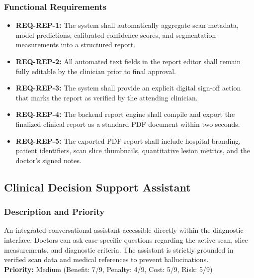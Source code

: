 \documentclass[12pt,a4paper]{report}
\begin{document}
\subsubsection{Functional Requirements}
\begin{itemize}
    \item \textbf{REQ-REP-1:} The system shall automatically aggregate scan metadata, model predictions, calibrated confidence scores, and segmentation measurements into a structured report.
    \item \textbf{REQ-REP-2:} All automated text fields in the report editor shall remain fully editable by the clinician prior to final approval.
    \item \textbf{REQ-REP-3:} The system shall provide an explicit digital sign-off action that marks the report as verified by the attending clinician.
    \item \textbf{REQ-REP-4:} The backend report engine shall compile and export the finalized clinical report as a standard PDF document within two seconds.
    \item \textbf{REQ-REP-5:} The exported PDF report shall include hospital branding, patient identifiers, scan slice thumbnails, quantitative lesion metrics, and the doctor's signed notes.
\end{itemize}

\subsection{Clinical Decision Support Assistant}
\subsubsection{Description and Priority}
An integrated conversational assistant accessible directly within the diagnostic interface. Doctors can ask case-specific questions regarding the active scan, slice measurements, and diagnostic criteria. The assistant is strictly grounded in verified scan data and medical references to prevent hallucinations.\\
\textbf{Priority:} Medium (Benefit: 7/9, Penalty: 4/9, Cost: 5/9, Risk: 5/9)
\end{document}
